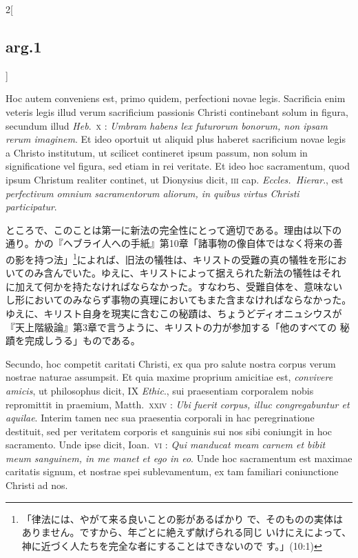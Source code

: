 \documentclass[paper=a4paper,fontsize=10pt,jafontsize=9pt,titlepage]{jlreq}
\begin{document}
\begin{paracol}{2}[\subsection{arg.1}]
\switchcolumn*

Hoc autem conveniens est, primo quidem, perfectioni novae
legis. Sacrificia enim veteris legis illud verum sacrificium passionis
Christi continebant solum in figura, secundum illud {\itshape
Heb}.~{\scshape x} : {\itshape Umbram habens lex futurorum bonorum,
non ipsam rerum imaginem}. Et ideo oportuit ut aliquid plus haberet
sacrificium novae legis a Christo institutum, ut scilicet contineret
ipsum passum, non solum in significatione vel figura, sed etiam in rei
veritate. Et ideo hoc sacramentum, quod ipsum Christum realiter
continet, ut Dionysius dicit, {\scshape iii} cap. {\itshape
Eccles.~Hierar}., est {\itshape perfectivum omnium sacramentorum
aliorum, in quibus virtus Christi participatur}.

\switchcolumn

ところで、このことは第一に新法の完全性にとって適切である。理由は以下の
通り。かの『ヘブライ人への手紙』第10章「諸事物の像自体ではなく将来の善
の影を持つ法」\footnote{「律法には、やがて来る良いことの影があるばかり
で、そのものの実体はありません。ですから、年ごとに絶えず献げられる同じ
いけにえによって、神に近づく人たちを完全な者にすることはできないので
す。」(10:1)}によれば、旧法の犠牲は、キリストの受難の真の犠牲を形にお
いてのみ含んでいた。ゆえに、キリストによって据えられた新法の犠牲はそれ
に加えて何かを持たなければならなかった。すなわち、受難自体を、意味ない
し形においてのみならず事物の真理においてもまた含まなければならなかった。
ゆえに、キリスト自身を現実に含むこの秘蹟は、ちょうどディオニュシウスが
『天上階級論』第3章で言うように、キリストの力が参加する「他のすべての
秘蹟を完成しうる」ものである。

\switchcolumn*

Secundo, hoc competit caritati Christi, ex qua pro salute nostra
corpus verum nostrae naturae assumpsit. Et quia maxime proprium
amicitiae est, {\itshape convivere amicis}, ut philosophus dicit, IX
{\itshape Ethic}., sui praesentiam corporalem nobis repromittit in
praemium, Matth.~{\scshape xxiv} : {\itshape Ubi fuerit corpus, illuc
congregabuntur et aquilae}. Interim tamen nec sua praesentia corporali
in hac peregrinatione destituit, sed per veritatem corporis et
sanguinis sui nos sibi coniungit in hoc sacramento. Unde ipse dicit,
Ioan.~{\scshape vi} : {\itshape Qui manducat meam carnem et bibit meum
sanguinem, in me manet et ego in eo}. Unde hoc sacramentum est maximae
caritatis signum, et nostrae spei sublevamentum, ex tam familiari
coniunctione Christi ad nos.

\switchcolumn


\end{paracol}
\end{document}
